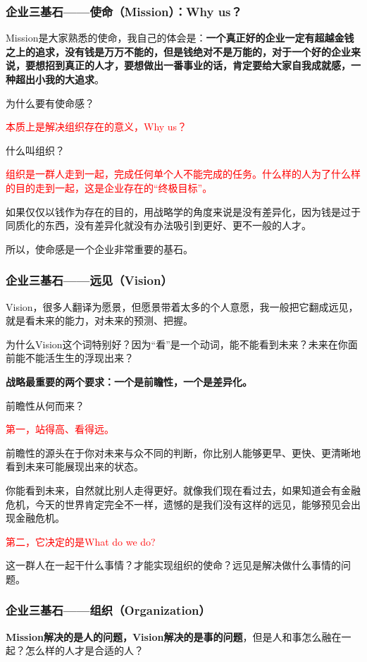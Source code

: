 \documentclass[12pt]{article}
\begin{document}
\subsubsection{企业三基石——使命（Mission）：Why us？}
Mission是大家熟悉的使命，我自己的体会是：\textbf{一个真正好的企业一定有超越金钱之上的追求，没有钱是万万不能的，但是钱绝对不是万能的，对于一个好的企业来说，要想招到真正的人才，要想做出一番事业的话，肯定要给大家自我成就感，一种超出小我的大追求}。

为什么要有使命感？

\textcolor{red}{本质上是解决组织存在的意义，Why us？}

什么叫组织？

\textcolor{red}{组织是一群人走到一起，完成任何单个人不能完成的任务。什么样的人为了什么样的目的走到一起，这是企业存在的“终极目标”。}

如果仅仅以钱作为存在的目的，用战略学的角度来说是没有差异化，因为钱是过于同质化的东西，没有差异化就没有办法吸引到更好、更不一般的人才。

所以，使命感是一个企业非常重要的基石。

\subsubsection{企业三基石——远见（Vision）}
Vision，很多人翻译为愿景，但愿景带着太多的个人意愿，我一般把它翻成远见，就是看未来的能力，对未来的预测、把握。

为什么Vision这个词特别好？因为“看”是一个动词，能不能看到未来？未来在你面前能不能活生生的浮现出来？

\textbf{战略最重要的两个要求：一个是前瞻性，一个是差异化。}

前瞻性从何而来？

\textcolor{red}{第一，站得高、看得远。}

前瞻性的源头在于你对未来与众不同的判断，你比别人能够更早、更快、更清晰地看到未来可能展现出来的状态。

你能看到未来，自然就比别人走得更好。就像我们现在看过去，如果知道会有金融危机，今天的世界肯定完全不一样，遗憾的是我们没有这样的远见，能够预见会出现金融危机。

\textcolor{red}{第二，它决定的是What do we do? }

这一群人在一起干什么事情？才能实现组织的使命？远见是解决做什么事情的问题。

\subsubsection{企业三基石——组织（Organization）}
\textbf{Mission解决的是人的问题，Vision解决的是事的问题}，但是人和事怎么融在一起？怎么样的人才是合适的人？
\end{document}
